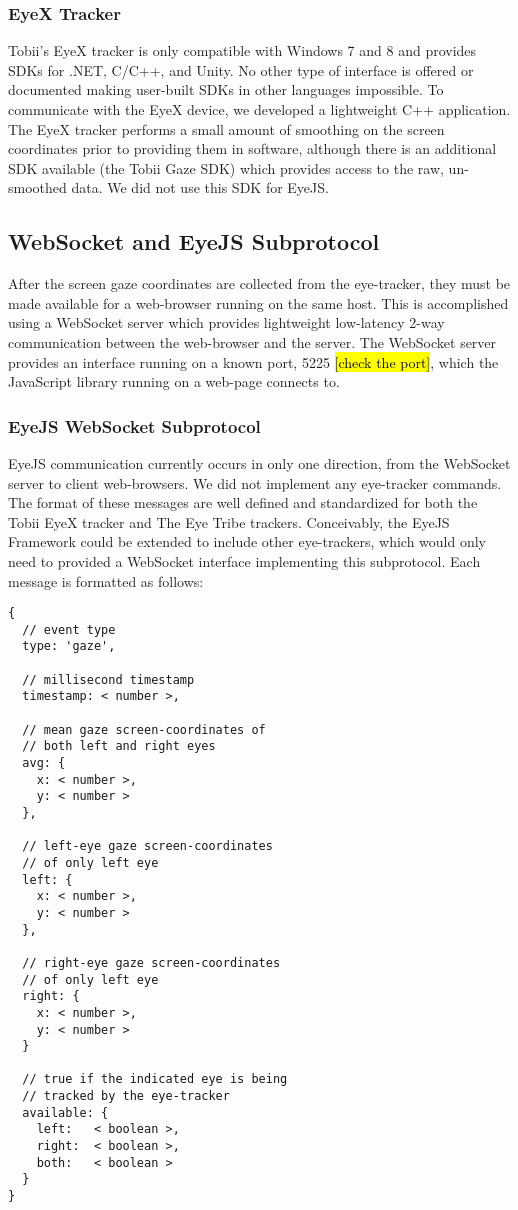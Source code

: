 \documentclass{sigchi}
\begin{document}
\subsubsection{EyeX Tracker}
Tobii's EyeX tracker is only compatible with Windows 7 and 8 and provides
SDKs for .NET, C/C++, and Unity. No other type of interface is offered
or documented making user-built SDKs in other languages impossible. To communicate with the EyeX device, we developed a lightweight C++
application. The EyeX tracker performs a small amount of smoothing on the
screen coordinates prior to providing them in software, although there
is an additional SDK available (the Tobii Gaze SDK) which provides access
to the raw, un-smoothed data. We did not use this SDK for EyeJS.


\subsection{WebSocket and EyeJS Subprotocol}
After the screen gaze coordinates are collected from the eye-tracker,
they must be made available for a web-browser running on the same host.
This is accomplished using a WebSocket server which provides lightweight
low-latency 2-way communication between the web-browser and the server.
The WebSocket server provides an interface running on a known port, 5225 \hl{[check the port]}, which the JavaScript library running on a web-page
connects to.

\subsubsection{EyeJS WebSocket Subprotocol}
EyeJS communication currently occurs in only one direction, from
the WebSocket server to client web-browsers. We did not implement
any eye-tracker commands. The format of these messages are well
defined and standardized
for both the Tobii EyeX tracker and The Eye Tribe trackers. Conceivably,
the EyeJS Framework could be extended to include other eye-trackers,
which would only need to provided a WebSocket interface implementing
this subprotocol. Each message is formatted as follows:

\begin{lstlisting}
{
  // event type
  type: 'gaze',

  // millisecond timestamp
  timestamp: < number >,

  // mean gaze screen-coordinates of
  // both left and right eyes
  avg: {
    x: < number >,
    y: < number >
  },

  // left-eye gaze screen-coordinates
  // of only left eye
  left: {
    x: < number >,
    y: < number >
  },

  // right-eye gaze screen-coordinates
  // of only left eye
  right: {
    x: < number >,
    y: < number >
  }

  // true if the indicated eye is being
  // tracked by the eye-tracker
  available: {
    left:   < boolean >,
    right:  < boolean >,
    both:   < boolean >
  }
}
\end{lstlisting}
\end{document}

